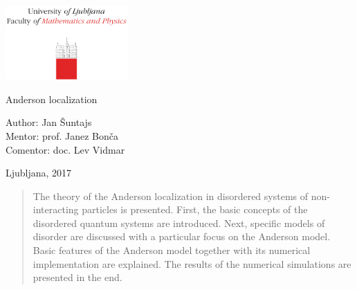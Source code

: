 \documentclass[10pt,a4paper]{article}
\begin{document}


\begin{center}

\includegraphics[width=0.35\textwidth]{logo_fmf_uni-lj_en.pdf}\\[8ex] 

\vspace{3mm}


\vspace{2 cm}

{ \Large }Anderson localization\\             
\vspace{3cm}


{\large Author: Jan Šuntajs\\
\large Mentor: prof. Janez Bonča \\
\large Comentor: doc. Lev Vidmar 
\vspace{2cm}



Ljubljana, 2017}
\vfill
\begin{abstract}
The theory of the Anderson localization in disordered systems of non-interacting particles is presented. First, the basic concepts of the disordered quantum systems are introduced. Next, specific models of disorder are discussed with a particular focus on the Anderson model. Basic features of the Anderson model together with its numerical implementation are explained. The results of the numerical simulations are presented in the end.  

\end{abstract}

\end{center}

\cleardoublepage

\thispagestyle{empty}


\clearpage
\pagestyle{fancy}
\setlength{\headheight}{0.6cm}
\fancyhf{}
\fancyhead[R]{\thepage}
\setcounter{page}{1}
\tableofcontents
\end{document}
